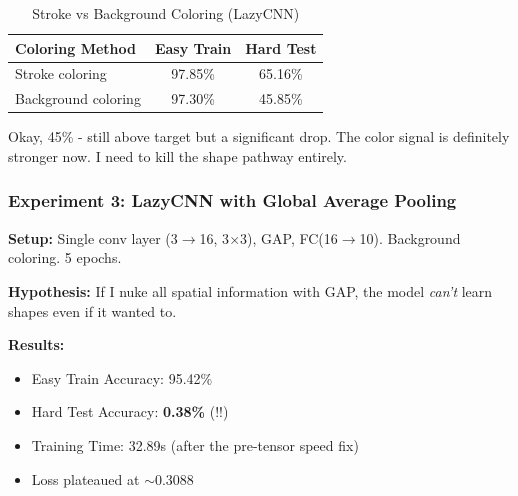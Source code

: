 \documentclass[9pt,a4paper,twocolumn,twoside]{tau-class/tau}
\begin{document}
        \begin{table}[H]
            \caption{Stroke vs Background Coloring (LazyCNN)}
            \label{tab:day3_coloring}
            \begin{tabular}{lcc}
            \toprule
            \textbf{Coloring Method} & \textbf{Easy Train} & \textbf{Hard Test} \\
            \midrule
            Stroke coloring & 97.85\% & 65.16\% \\
            Background coloring & 97.30\% & 45.85\% \\
            \bottomrule
            \end{tabular}
        \end{table}

        Okay, 45\% - still above target but a significant drop. The color signal is definitely stronger now. I need to kill the shape pathway entirely.

        \subsubsection{Experiment 3: LazyCNN with Global Average Pooling}

        \textbf{Setup:} Single conv layer (3$\rightarrow$16, 3$\times$3), GAP, FC(16$\rightarrow$10). Background coloring. 5 epochs.

        \textbf{Hypothesis:} If I nuke all spatial information with GAP, the model \textit{can't} learn shapes even if it wanted to.

        \textbf{Results:}
        \begin{itemize}
            \item Easy Train Accuracy: 95.42\%
            \item Hard Test Accuracy: \textbf{0.38\%} (!!)
            \item Training Time: 32.89s (after the pre-tensor speed fix)
            \item Loss plateaued at $\sim$0.3088
        \end{itemize}
\end{document}
